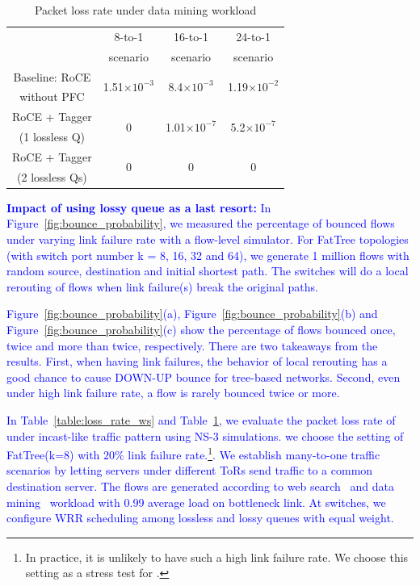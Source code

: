 \begin{table}[t]
	\footnotesize
	\centering
	\begin{tabular}{|c|c|c|c|}
		
		\hline
		& 8-to-1 & 16-to-1 & 24-to-1 \\
		&scenario & scenario & scenario \\
		\hline
		
		Baseline: RoCE  & \multirow{2}{*}{1.51$\times 10^{-3}$} & \multirow{2}{*}{8.4$\times 10^{-3}$}  & \multirow{2}{*}{1.19$\times 10^{-2}$} \\
		without PFC &  &  & \\
		\hline
				
		\hline
		RoCE + Tagger & \multirow{2}{*}{0} & \multirow{2}{*}{1.01$\times 10^{-7}$}  & \multirow{2}{*}{5.2$\times 10^{-7}$} \\
		(1 lossless Q) &  &  & \\
		\hline
		
		RoCE + Tagger & \multirow{2}{*}{0} & \multirow{2}{*}{0}  & \multirow{2}{*}{0} \\
		(2 lossless Qs) &  &  & \\
		\hline
	\end{tabular}
	\caption{Packet loss rate under data mining workload}
	\vspace{-2.5em}
	\label{table:loss_rate_dm} 
\end{table}


\textcolor{blue}{\textbf{Impact of using lossy queue as a last resort:} In Figure~\ref{fig:bounce_probability}, we measured the percentage of bounced flows under varying link failure rate with a flow-level simulator. For FatTree topologies (with switch port number k = 8, 16, 32 and 64), we generate 1 million flows with random source, destination and initial shortest path. The switches will do a local rerouting of flows when link failure(s) break the original paths.}

\textcolor{blue}{Figure~\ref{fig:bounce_probability}(a), Figure~\ref{fig:bounce_probability}(b) and Figure~\ref{fig:bounce_probability}(c) show the percentage of flows bounced once, twice and more than twice, respectively. There are two takeaways from the results. First, when having link failures, the behavior of local rerouting has a good chance to cause DOWN-UP bounce for tree-based networks. Second, even under high link failure rate,  a flow is rarely bounced twice or more.}


\textcolor{blue}{In Table~\ref{table:loss_rate_ws} and Table~\ref{table:loss_rate_dm}, we evaluate the packet loss rate of \sysname{} under incast-like traffic pattern using NS-3 simulations. we choose the setting of FatTree(k=8) with $20\%$ link failure rate.\footnote{In practice, it is unlikely to have such a high link failure rate. We choose this setting as a stress test for \sysname{} .}. We establish many-to-one traffic scenarios by letting servers under different ToRs send traffic to a common destination server.  The flows are generated according to web search~\cite{dctcp} and data mining~\cite{vl2}  workload with 0.99 average load on bottleneck link. At switches, we configure WRR scheduling among lossless and lossy queues with equal weight.}

